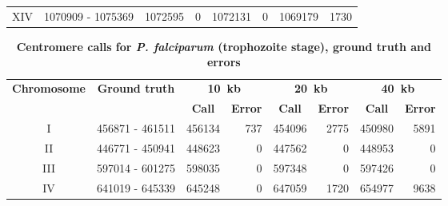 \begin{table}[ht!]
\begin{center}
\begin{tabular}{c | c  r  r  r  r r r}
XIV & \num[group-separator={\,}]{1070909} - \num[group-separator={\,}]{1075369} & \num[group-separator={\,}]{1072595} & \small{\num[group-separator={\,}]{0}}  & \num[group-separator={\,}]{1072131} & \small{\num[group-separator={\,}]{0}}  & \num[group-separator={\,}]{1069179} & \small{\num[group-separator={\,}]{1730}}  \\
\end{tabular}
\end{center}
\label{supptable:rings_results}
\end{table}


\begin{table}[ht!]
\caption{\textbf{Centromere calls for \textit{P. falciparum} (trophozoite stage),
ground truth and errors}}
\vspace{10pt}
\begin{center}
\begin{tabular}{c | c  r  r  r  r r r}
\textbf{Chromosome}  & \textbf{Ground truth} & \multicolumn{2}{c}{\textbf{10~kb}} & \multicolumn{2}{c}{\textbf{20~kb}} & \multicolumn{2}{c}{\textbf{40~kb}} \\
  &   &  \multicolumn{1}{c}{\textbf{Call}} &  \multicolumn{1}{c}{\textbf{Error}} &  \multicolumn{1}{c}{\textbf{Call}} &  \multicolumn{1}{c}{\textbf{Error}} &  \multicolumn{1}{c}{\textbf{Call}} &  \multicolumn{1}{c}{\textbf{Error}} \\
\hline
I & \num[group-separator={\,}]{456871} - \num[group-separator={\,}]{461511} & \num[group-separator={\,}]{456134} & \small{\num[group-separator={\,}]{737}}  & \num[group-separator={\,}]{454096} & \small{\num[group-separator={\,}]{2775}}  & \num[group-separator={\,}]{450980} & \small{\num[group-separator={\,}]{5891}}  \\
II & \num[group-separator={\,}]{446771} - \num[group-separator={\,}]{450941} & \num[group-separator={\,}]{448623} & \small{\num[group-separator={\,}]{0}}  & \num[group-separator={\,}]{447562} & \small{\num[group-separator={\,}]{0}}  & \num[group-separator={\,}]{448953} & \small{\num[group-separator={\,}]{0}}  \\
III & \num[group-separator={\,}]{597014} - \num[group-separator={\,}]{601275} & \num[group-separator={\,}]{598035} & \small{\num[group-separator={\,}]{0}}  & \num[group-separator={\,}]{597348} & \small{\num[group-separator={\,}]{0}}  & \num[group-separator={\,}]{597426} & \small{\num[group-separator={\,}]{0}}  \\
IV & \num[group-separator={\,}]{641019} - \num[group-separator={\,}]{645339} & \num[group-separator={\,}]{645248} & \small{\num[group-separator={\,}]{0}}  & \num[group-separator={\,}]{647059} & \small{\num[group-separator={\,}]{1720}}  & \num[group-separator={\,}]{654977} & \small{\num[group-separator={\,}]{9638}}  \\

\end{tabular}
\end{center}
\end{table}
